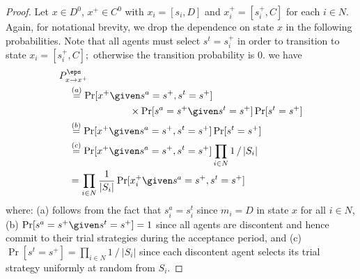 \begin{proof}
Let $x\in D^0$, $x^+\in C^0$ with $x_i = [s_i,D]$ and $x_i^+ = [s_i^+,C]$  for each $i\in N.$ Again, for notational brevity, we drop the dependence on state $x$ in the following probabilities. Note that all agents must select $s^t = s_i^+$ in order to transition to state $x_i = [s_i^+,C];$ otherwise the transition probability is 0.
we have
{\allowdisplaybreaks[3]\begin{align*}
&P^\eps_{x\to x^+} \nonumber\\
&\quad \stackrel{(a)}{=}\Pr[x^+\given s^a = s^+, s^t = s^+]\nonumber\\
&\hspace{1in} \times\Pr[ s^a = s^+\given s^t = s^+]\Pr[ s^t = s^+]\\
&\quad \stackrel{(b)}{=}\Pr[x^+\given s^a = s^+, s^t = s^+]\Pr[ s^t = s^+]\\
&\quad \stackrel{(c)}{=}\Pr[x^+\given s^a = s^+, s^t = s^+]\prod_{i\in N}1\mathop{/}|S_i|\\
&\quad = \prod_{i\in N}{1\over|S_i|}\Pr[x_i^+\given s^a = s^+,s^t = s^+]
\end{align*}}
where:
(a) follows from the fact that $s_i^a = s_i^t$ since $m_i = D$ in state $x$ for all $i\in N$,
(b) $\Pr[ s^a = s^+\given s^t = s^+] = 1$ since all agents are discontent and hence commit to their trial strategies during the acceptance period, and
(c) $\Pr[ s^t = s^+] = \prod_{i\in N}1\mathop{/}|S_i|$ since each discontent agent selects its trial strategy uniformly at random from $S_i$.



\end{proof}
